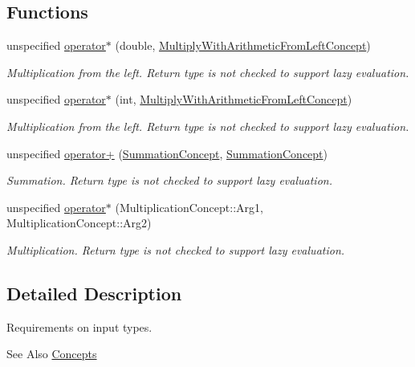 \subsection*{Functions}
\begin{DoxyCompactItemize}
\item 
unspecified \hyperlink{group__ConceptGroup_ga499e3c82ec16cb79ca3ef4e4dfcbbfb5}{operator$\ast$} (double, \hyperlink{structfuncy_1_1Concepts_1_1MultiplyWithArithmeticFromLeftConcept}{Multiply\-With\-Arithmetic\-From\-Left\-Concept})
\begin{DoxyCompactList}\small\item\em Multiplication from the left. Return type is not checked to support lazy evaluation. \end{DoxyCompactList}\item 
unspecified \hyperlink{group__ConceptGroup_ga33a9db638e532658e3b0ce78e2b8a8d4}{operator$\ast$} (int, \hyperlink{structfuncy_1_1Concepts_1_1MultiplyWithArithmeticFromLeftConcept}{Multiply\-With\-Arithmetic\-From\-Left\-Concept})
\begin{DoxyCompactList}\small\item\em Multiplication from the left. Return type is not checked to support lazy evaluation. \end{DoxyCompactList}\item 
unspecified \hyperlink{group__ConceptGroup_ga13e0cc4a3b1f8a7f286fc017458c4364}{operator+} (\hyperlink{structfuncy_1_1Concepts_1_1SummationConcept}{Summation\-Concept}, \hyperlink{structfuncy_1_1Concepts_1_1SummationConcept}{Summation\-Concept})
\begin{DoxyCompactList}\small\item\em Summation. Return type is not checked to support lazy evaluation. \end{DoxyCompactList}\item 
unspecified \hyperlink{group__ConceptGroup_ga38d0d06854345ffc7ce9b41a1132e11c}{operator$\ast$} (Multiplication\-Concept\-::\-Arg1, Multiplication\-Concept\-::\-Arg2)
\begin{DoxyCompactList}\small\item\em Multiplication. Return type is not checked to support lazy evaluation. \end{DoxyCompactList}\end{DoxyCompactItemize}


\subsection{Detailed Description}
Requirements on input types. \begin{DoxySeeAlso}{See Also}
\hyperlink{namespacefuncy_1_1Concepts}{Concepts} 
\end{DoxySeeAlso}
